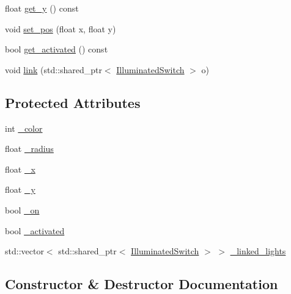 \begin{DoxyCompactItemize}
\item 
float \hyperlink{classfastsim_1_1_illuminated_switch_a44d7de67d0ae8399982ebd74169aabd8}{get\+\_\+y} () const 
\item 
void \hyperlink{classfastsim_1_1_illuminated_switch_a996b5177dd26cf086e0bd5428b86fbde}{set\+\_\+pos} (float x, float y)
\item 
bool \hyperlink{classfastsim_1_1_illuminated_switch_a62102183f5fede38f86f81aba22bba74}{get\+\_\+activated} () const 
\item 
void \hyperlink{classfastsim_1_1_illuminated_switch_a6996c7dd1af6369aef0da762dc98c8e8}{link} (std\+::shared\+\_\+ptr$<$ \hyperlink{classfastsim_1_1_illuminated_switch}{Illuminated\+Switch} $>$ o)
\end{DoxyCompactItemize}
\subsection*{Protected Attributes}
\begin{DoxyCompactItemize}
\item 
int \hyperlink{classfastsim_1_1_illuminated_switch_ae24d4e006a7cbc37bf9e17d2e0768171}{\+\_\+color}
\item 
float \hyperlink{classfastsim_1_1_illuminated_switch_ac204dfa0671fc1d860ab19371a15dcf9}{\+\_\+radius}
\item 
float \hyperlink{classfastsim_1_1_illuminated_switch_a5dca28e3c3202f405cae1d81fceb4e14}{\+\_\+x}
\item 
float \hyperlink{classfastsim_1_1_illuminated_switch_af1f3ac22f8c8b938dcfa62efa2d322bd}{\+\_\+y}
\item 
bool \hyperlink{classfastsim_1_1_illuminated_switch_a159fe2f58f156f5fceec14998739918d}{\+\_\+on}
\item 
bool \hyperlink{classfastsim_1_1_illuminated_switch_ac886e81a15bbd6f9806da5154655cf9e}{\+\_\+activated}
\item 
std\+::vector$<$ std\+::shared\+\_\+ptr$<$ \hyperlink{classfastsim_1_1_illuminated_switch}{Illuminated\+Switch} $>$ $>$ \hyperlink{classfastsim_1_1_illuminated_switch_adc857871c0d0f304d4d21655f54f4f0f}{\+\_\+linked\+\_\+lights}
\end{DoxyCompactItemize}


\subsection{Constructor \& Destructor Documentation}
